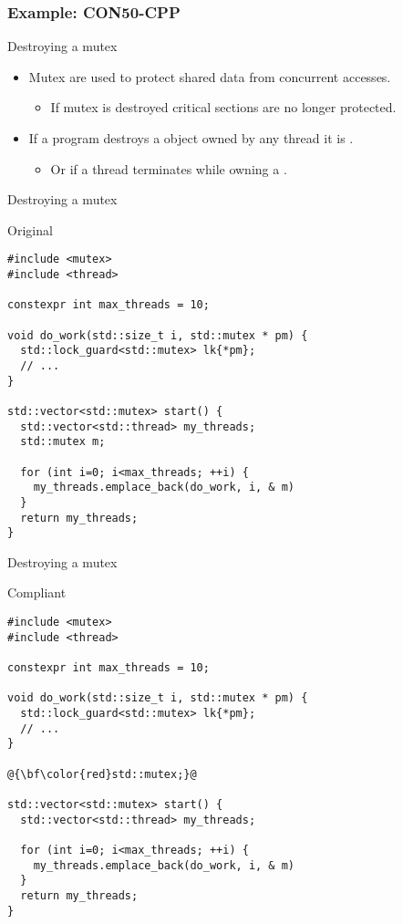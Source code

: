 \subsubsection{Example: CON50-CPP}

\begin{frame}[t]{Destroying a mutex}
\begin{itemize}
  \item Mutex are used to protect shared data from concurrent accesses.
    \begin{itemize}
      \item If mutex is destroyed critical sections are no longer protected.
    \end{itemize}

  \vfill
  \item If a program destroys a  object owned by any thread
        it is .
    \begin{itemize}
      \item Or if a thread terminates while owning a .
    \end{itemize}
\end{itemize}
\end{frame}

\begin{frame}[t,fragile]{Destroying a mutex}
\begin{block}{Original}
\begin{lstlisting}[basicstyle=\tiny]
#include <mutex>
#include <thread>

constexpr int max_threads = 10;

void do_work(std::size_t i, std::mutex * pm) {
  std::lock_guard<std::mutex> lk{*pm};
  // ...
}

std::vector<std::mutex> start() {
  std::vector<std::thread> my_threads;
  std::mutex m;

  for (int i=0; i<max_threads; ++i) {
    my_threads.emplace_back(do_work, i, & m)
  }
  return my_threads;
}
\end{lstlisting}
\end{block}
\end{frame}

\begin{frame}[t,fragile]{Destroying a mutex}
\begin{block}{Compliant}
\begin{lstlisting}[basicstyle=\tiny,escapechar=@]
#include <mutex>
#include <thread>

constexpr int max_threads = 10;

void do_work(std::size_t i, std::mutex * pm) {
  std::lock_guard<std::mutex> lk{*pm};
  // ...
}

@{\bf\color{red}std::mutex;}@

std::vector<std::mutex> start() {
  std::vector<std::thread> my_threads;

  for (int i=0; i<max_threads; ++i) {
    my_threads.emplace_back(do_work, i, & m)
  }
  return my_threads;
}
\end{lstlisting}
\end{block}
\end{frame}

